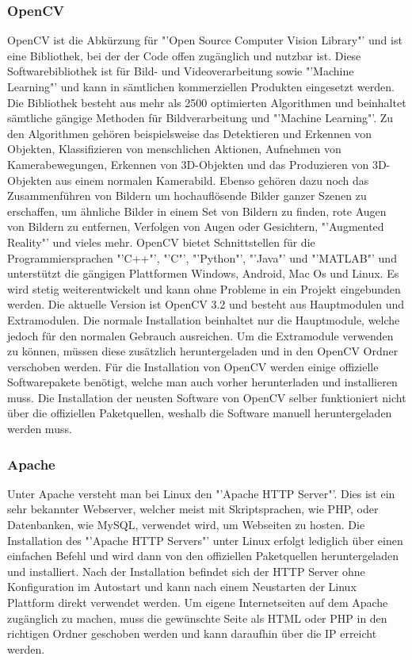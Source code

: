 \subsubsection{OpenCV}
OpenCV ist die Abkürzung für "'Open Source Computer Vision Library"' und ist eine Bibliothek, bei der der Code offen zugänglich und nutzbar ist. Diese Softwarebibliothek ist für Bild- und Videoverarbeitung sowie "'Machine Learning"' und kann in sämtlichen kommerziellen Produkten eingesetzt werden. Die Bibliothek besteht aus mehr als 2500 optimierten Algorithmen und beinhaltet sämtliche gängige Methoden für Bildverarbeitung und "'Machine Learning"'. Zu den Algorithmen gehören beispielsweise das Detektieren und Erkennen von Objekten, Klassifizieren von menschlichen Aktionen, Aufnehmen von Kamerabewegungen, Erkennen von 3D-Objekten und das Produzieren von 3D-Objekten aus einem normalen Kamerabild. Ebenso gehören dazu noch das Zusammenführen von Bildern um hochauflösende Bilder ganzer Szenen zu erschaffen, um ähnliche Bilder in einem Set von Bildern zu finden, rote Augen von Bildern zu entfernen, Verfolgen von Augen oder Gesichtern, "'Augmented Reality"' und vieles mehr. OpenCV bietet Schnittstellen für die Programmiersprachen "'C++"', "'C"', "'Python"', "'Java"' und "'MATLAB"' und unterstützt die gängigen Plattformen Windows, Android, Mac Os und Linux. Es wird stetig weiterentwickelt und kann ohne Probleme in ein Projekt eingebunden werden. Die aktuelle Version ist OpenCV 3.2 und besteht aus Hauptmodulen und Extramodulen. Die normale Installation beinhaltet nur die Hauptmodule, welche jedoch für den normalen Gebrauch ausreichen. Um die Extramodule verwenden zu können, müssen diese zusätzlich heruntergeladen und in den OpenCV Ordner verschoben werden. Für die Installation von OpenCV werden einige offizielle Softwarepakete benötigt, welche man auch vorher herunterladen und installieren muss. Die Installation der neusten Software von OpenCV selber funktioniert nicht über die offiziellen Paketquellen, weshalb die Software manuell heruntergeladen werden muss. \cite{OpenCV}

\subsubsection{Apache}
Unter Apache versteht man bei Linux den "'Apache HTTP Server"'. Dies ist ein sehr bekannter Webserver, welcher meist mit Skriptsprachen, wie PHP, oder Datenbanken, wie MySQL, verwendet wird, um Webseiten zu hosten. Die Installation des "'Apache HTTP Servers"' unter Linux erfolgt lediglich über einen einfachen Befehl und wird dann von den offiziellen Paketquellen heruntergeladen und installiert. Nach der Installation befindet sich der HTTP Server ohne Konfiguration im Autostart und kann nach einem Neustarten der Linux Plattform direkt verwendet werden. Um eigene Internetseiten auf dem Apache zugänglich zu machen, muss die gewünschte Seite als HTML oder PHP in den richtigen Ordner geschoben werden und kann daraufhin über die IP erreicht werden. \cite{Apache}
